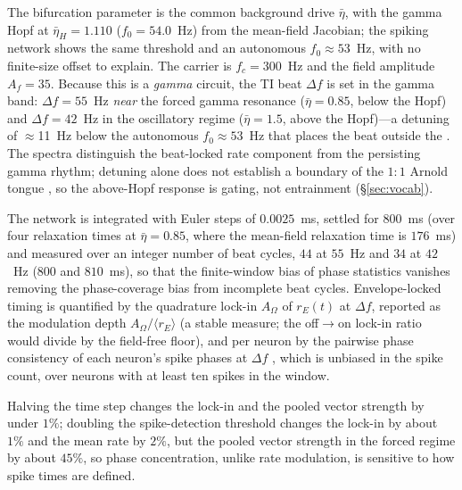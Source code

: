 \documentclass[11pt,a4paper]{article}
\providecommand{\DIFaddtex}[1]{{\protect\color{blue} \sf #1}} %
\providecommand{\DIFdeltex}[1]{{\protect\color{red} \scriptsize #1}} %
\providecommand{\DIFaddbegin}{} %
\providecommand{\DIFaddend}{} %
\providecommand{\DIFdelbegin}{} %
\providecommand{\DIFdelend}{} %
\providecommand{\DIFadd}[1]{\texorpdfstring{\DIFaddtex{#1}}{#1}} %
\providecommand{\DIFdel}[1]{\texorpdfstring{\DIFdeltex{#1}}{}} %
\begin{document}
The bifurcation parameter is the common
background drive $\bar\eta$, with the gamma Hopf at $\bar\eta_H=1.110$ ($f_0=54.0$~Hz)
from the mean-field Jacobian; the spiking network shows the same threshold and an
autonomous $f_0\!\approx\!53$~Hz, with no finite-size offset to explain. The carrier is
$f_c=300$~Hz and the field amplitude $A_f=35$. Because
this is a \emph{gamma} circuit, the TI beat $\Delta f$ is set in the gamma band:
$\Delta f=55$~Hz \emph{near} the forced gamma resonance ($\bar\eta=0.85$, below the Hopf) and
$\Delta f=42$~Hz in the oscillatory regime ($\bar\eta=1.5$, above the Hopf)---a detuning of
$\approx$11~Hz below the autonomous $f_0\!\approx\!53$~Hz\DIFdelbegin \DIFdel{that places the beat outside the }\DIFdelend \DIFaddbegin \DIFadd{. The spectra distinguish
the beat-locked rate component from the persisting gamma rhythm; detuning alone
does not establish a boundary of the }\DIFaddend $1{:}1$ Arnold tongue \DIFdelbegin \DIFdel{, so the above-Hopf response is gating, not entrainment
}\DIFdelend (\S\ref{sec:vocab}).

The network is integrated with Euler steps of $0.0025$~ms, settled for $800$~ms (over
four relaxation times at $\bar\eta=0.85$, where the mean-field relaxation time is
$176$~ms) and measured over an integer number of beat cycles, $44$ at $55$~Hz and $34$ at
$42$~Hz ($800$ and $810$~ms), \DIFdelbegin \DIFdel{so that the finite-window bias of phase statistics
vanishes}\DIFdelend \DIFaddbegin \DIFadd{removing the phase-coverage bias from incomplete
beat cycles}\DIFaddend . Envelope-locked timing is quantified by the quadrature lock-in $A_\Omega$ of
$r_E(t)$ at $\Delta f$, reported as the modulation depth $A_\Omega/\langle r_E\rangle$ (a
stable measure; the off$\to$on lock-in ratio would divide by the field-free floor), and
per neuron by the pairwise phase consistency of each neuron's spike phases at $\Delta f$
\cite{vinck2010}, which is unbiased in the spike count, over neurons with at least ten
spikes in the window.

Halving the time step changes the lock-in and the pooled vector
strength by under $1\%$; doubling the spike-detection threshold changes the lock-in by
about $1\%$ and the mean rate by $2\%$, but the pooled vector strength in the forced
regime by about $45\%$, so phase concentration, unlike rate modulation, is sensitive to
how spike times are defined.
\end{document}
